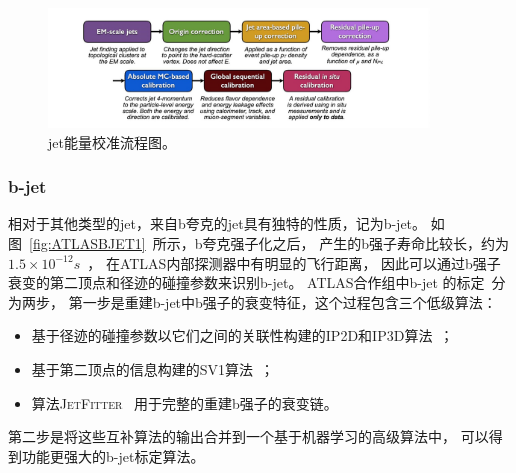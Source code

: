 \begin{figure}
  \begin{center}
    \includegraphics[width=0.9\textwidth]{figuresEXP/ATLASJET3.jpg}
  \end{center}
  \caption{jet能量校准流程图。 }
    \label{fig:ATLASJET3}
\end{figure}



\subsubsection{b-jet}
\label{sec:BJET}

相对于其他类型的jet，来自b夸克的jet具有独特的性质，记为b-jet。
如图~\ref{fig:ATLASBJET1}~所示，b夸克强子化之后，
产生的b强子寿命比较长，约为$1.5\times10^{-12}s$~\cite{PDG}，
在ATLAS内部探测器中有明显的飞行距离，
因此可以通过b强子衰变的第二顶点和径迹的碰撞参数来识别b-jet。
ATLAS合作组中b-jet
的标定~\cite{BTAGGING}分为两步，
第一步是重建b-jet中b强子的衰变特征，这个过程包含三个低级算法：
\begin{itemize}
	\item  基于径迹的碰撞参数以它们之间的关联性构建的\textsc{IP2D}和\textsc{IP3D}算法~\cite{IPTD}；
	\item 基于第二顶点的信息构建的\textsc{SV1}算法~\cite{SVN}；
	\item 算法\textsc{JetFitter}~\cite{JETFT}
	用于完整的重建b强子的衰变链。
\end{itemize}
第二步是将这些互补算法的输出合并到一个基于机器学习的高级算法中，
可以得到功能更强大的b-jet标定算法。


